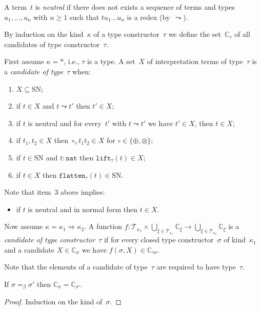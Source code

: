 \documentclass[runningheads,a4paper]{llncs}
\newcommand{\arrkind}{\Rightarrow}
\newcommand{\Tc}{\mathcal{T}}
\newcommand{\nat}{\mathtt{nat}}
\newcommand{\flatten}{\mathtt{flatten}}
\newcommand{\lift}{\mathtt{lift}}
\newcommand{\SN}{\mathrm{SN}}
\newcommand{\Cb}{\mathbb{C}}
\begin{document}
\begin{definition}\label{def_candidate}\normalfont
  A term~$t$ is \emph{neutral} if there does not exists a sequence of
  terms and types~$u_1,\ldots,u_n$ with $n \ge 1$ such that $t u_1
  \ldots u_n$ is a redex (by~$\leadsto$).

  By induction on the kind~$\kappa$ of a type constructor~$\tau$ we
  define the set~$\Cb_\tau$ of all candidates of type
  constructor~$\tau$.

  First assume $\kappa=*$, i.e., $\tau$ is a type. A set~$X$ of
  interpretation terms of type~$\tau$ is a \emph{candidate of
    type~$\tau$} when:
  \begin{enumerate}
  \item $X \subseteq \SN$;
  \item if $t \in X$ and $t \leadsto t'$ then $t' \in X$;
  \item if $t$ is neutral and for every~$t'$ with $t \leadsto t'$ we
    have $t' \in X$, then $t \in X$;
  \item if $t_1,t_2 \in X$ then $\circ_\tau t_1 t_2 \in X$ for
    $\circ \in \{\oplus,\otimes\}$;
  \item if $t \in \SN$ and $t : \nat$ then $\lift_\tau(t) \in X$;
  \item if $t \in X$ then $\flatten_\tau(t) \in \SN$.
  \end{enumerate}
  Note that item~3 above implies:
  \begin{itemize}
  \item if $t$ is neutral and in normal form then $t \in X$.
  \end{itemize}

  Now assume $\kappa = \kappa_1\arrkind\kappa_2$. A function $f :
  \Tc_{\kappa_1} \times \bigcup_{\xi\in\Tc_{\kappa_1}}\Cb_\xi \to
  \bigcup_{\xi\in\Tc_{\kappa_2}}\Cb_\xi$ is a \emph{candidate of type
    constructor~$\tau$} if for every closed type constructor~$\sigma$
  of kind~$\kappa_1$ and a candidate $X \in \Cb_\sigma$ we have
  $f(\sigma,X) \in \Cb_{\tau\sigma}$.
\end{definition}

Note that the elements of a candidate of type~$\tau$ are required to
have type~$\tau$.

\begin{lemma}\label{lem_beta_candidate}
  If $\sigma =_\beta \sigma'$ then $\Cb_\sigma = \Cb_{\sigma'}$.
\end{lemma}

\begin{proof}
  Induction on the kind of~$\sigma$.
\end{proof}
\end{document}
